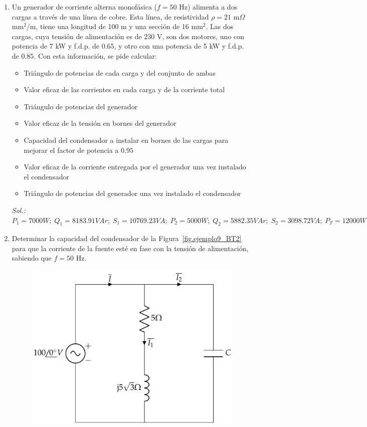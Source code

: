 \begin{enumerate}
\item Un generador de corriente alterna monofásica ($f=50$ Hz) alimenta a dos cargas a través de una línea de cobre. Esta línea, de resistividad $\rho=21$ m$\Omega$ mm$^2$/m, tiene una longitud de 100 m y una sección de 16 mm$^2$. Las dos cargas, cuya tensión de alimentación es de 230 V, son dos motores, uno con potencia de 7 kW y f.d.p. de $0.65$, y otro con una potencia de 5 kW y f.d.p. de $0.85$. Con esta información, se pide calcular:
\begin{itemize}
    \item Triángulo de potencias de cada carga y del conjunto de ambas
    \item Valor eficaz de las corrientes en cada carga y de la corriente total
    \item Triángulo de potencias del generador
    \item Valor eficaz de la tensión en bornes del generador
    \item Capacidad del condensador a instalar en bornes de las cargas para mejorar el factor de potencia a $0.95$
    \item Valor eficaz de la corriente entregada por el generador una vez instalado el condensador
    \item Triángulo de potencias del generador una vez instalado el condensador
\end{itemize}
\emph{Sol.: $P_1=7000W;\; Q_1=8183.91VAr;\;S_1=10769.23VA;\;P_2=5000W;\;Q_2=5882.35VAr;\;S_2=3098.72VA;\;P_T=12000W;\;Q_T=11282.63VAr;\;S_T=16471.12VA;\, I_1=46.82\,A;\;I_2=25.58\,A;\;I_T=71.62\,A;\,P_g=13333.65 W;\;Q_g=11282.63 VAr;\,S_g=17466.65 VA;\;U_g=243.88 V;\; C=441.66 \mu F;\,I'=54.92 A;\;P_g'=12784.21 W;\;Q_g'=3944.21 VAr;\;S_g'=13378.82 VA$}
\item Determinar la capacidad del condensador de la Figura~\ref{fig.ejemplo9_BT2} para que la corriente de la fuente esté en fase con la tensión de alimentación, sabiendo que $f=50$ Hz.
	    \begin{figure}[H]
	        \centering
	        \includegraphics{../figs/ejemplo9_BT2.pdf}

\end{figure}
\end{enumerate}
